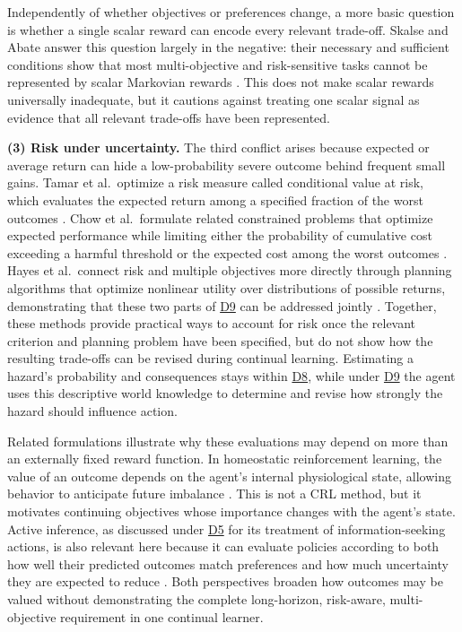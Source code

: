 \documentclass[10pt,journal,compsoc]{IEEEtran}
\DeclareRobustCommand{\Dref}[1]{\hyperref[sec:d#1]{D#1}}
\begin{document}
Independently of whether objectives or preferences change, a more basic question is whether a single scalar reward can encode every relevant trade-off.
Skalse and Abate answer this question largely in the negative: their necessary and sufficient conditions show that most multi-objective and risk-sensitive tasks cannot be represented by scalar Markovian rewards \cite{skalse2023}.
This does not make scalar rewards universally inadequate, but it cautions against treating one scalar signal as evidence that all relevant trade-offs have been represented.

\noindent\textbf{(3) Risk under uncertainty.}
The third conflict arises because expected or average return can hide a low-probability severe outcome behind frequent small gains.
Tamar et al.\ optimize a risk measure called conditional value at risk, which evaluates the expected return among a specified fraction of the worst outcomes \cite{tamar2015}.
Chow et al.\ formulate related constrained problems that optimize expected performance while limiting either the probability of cumulative cost exceeding a harmful threshold or the expected cost among the worst outcomes \cite{chow2018}.
Hayes et al.\ connect risk and multiple objectives more directly through planning algorithms that optimize nonlinear utility over distributions of possible returns, demonstrating that these two parts of \Dref{9} can be addressed jointly \cite{hayes2023}.
Together, these methods provide practical ways to account for risk once the relevant criterion and planning problem have been specified, but do not show how the resulting trade-offs can be revised during continual learning.
Estimating a hazard's probability and consequences stays within \Dref{8}, while under \Dref{9} the agent uses this descriptive world knowledge to determine and revise how strongly the hazard should influence action.

Related formulations illustrate why these evaluations may depend on more than an externally fixed reward function.
In homeostatic reinforcement learning, the value of an outcome depends on the agent's internal physiological state, allowing behavior to anticipate future imbalance \cite{keramati2014}.
This is not a CRL method, but it motivates continuing objectives whose importance changes with the agent's state.
Active inference, as discussed under \Dref{5} for its treatment of information-seeking actions, is also relevant here because it can evaluate policies according to both how well their predicted outcomes match preferences and how much uncertainty they are expected to reduce \cite{friston2017}.
Both perspectives broaden how outcomes may be valued without demonstrating the complete long-horizon, risk-aware, multi-objective requirement in one continual learner.
\end{document}
